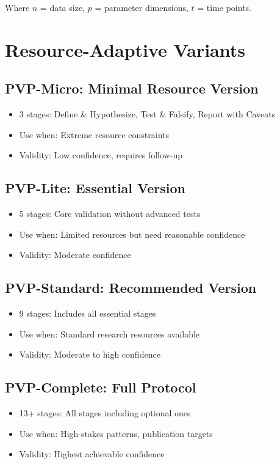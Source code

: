 \documentclass[12pt,oneside]{memoir}
\theoremstyle{plain}
\theoremstyle{definition}
\theoremstyle{remark}
\begin{document}
Where $n$ = data size, $p$ = parameter dimensions, $t$ = time points.

\section{Resource-Adaptive Variants}

\subsection{PVP-Micro: Minimal Resource Version}
\begin{itemize}
\item 3 stages: Define \& Hypothesize, Test \& Falsify, Report with Caveats
\item Use when: Extreme resource constraints
\item Validity: Low confidence, requires follow-up
\end{itemize}

\subsection{PVP-Lite: Essential Version}
\begin{itemize}
\item 5 stages: Core validation without advanced tests
\item Use when: Limited resources but need reasonable confidence
\item Validity: Moderate confidence
\end{itemize}

\subsection{PVP-Standard: Recommended Version}
\begin{itemize}
\item 9 stages: Includes all essential stages
\item Use when: Standard research resources available
\item Validity: Moderate to high confidence
\end{itemize}

\subsection{PVP-Complete: Full Protocol}
\begin{itemize}
\item 13+ stages: All stages including optional ones
\item Use when: High-stakes patterns, publication targets
\item Validity: Highest achievable confidence
\end{itemize}
\end{document}
